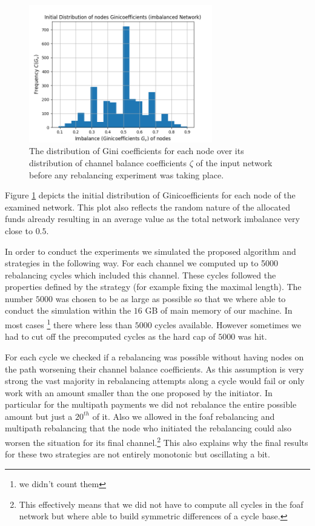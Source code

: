 \documentclass[a4paper]{paper}
\begin{document}
\begin{figure}
 \centering
 \includegraphics[width=8cm]{code/vs/fig/initial_ginis_before_rebalancing.png}
 \caption{The distribution of Gini coefficients for each node over its distribution of channel balance coefficients $\zeta$ of the input network before any rebalancing experiment was taking place.}
 \label{fig:initial_ginis}
\end{figure}
Figure \cref{fig:initial_ginis} depicts the initial distribution of Ginicoefficients for each node of the examined network.
This plot also reflects the random nature of the allocated funds already resulting in an average value as the total network imbalance very close to $0.5$.

In order to conduct the experiments we simulated the proposed algorithm and strategies in the following way.
For each channel we computed up to 5000 rebalancing cycles which included this channel.
These cycles followed the properties defined by the strategy (for example fixing the maximal length).
The number $5000$ was chosen to be as large as possible so that we where able to conduct the simulation within the $16$ GB of main memory of our machine.
In most cases \footnote{we didn't count them} there where less than $5000$ cycles available.
However sometimes we had to cut off the precomputed cycles as the hard cap of $5000$ was hit.

For each cycle we checked if a rebalancing was possible without having nodes on the path worsening their channel balance coefficients.
As this assumption is very strong the vast majority in rebalancing attempts along a cycle would fail or only work with an amount smaller than the one proposed by the initiator. 
In particular for the multipath payments we did not rebalance the entire possible amount but just a $20^{th}$ of it.
Also we allowed in the foaf rebalancing and multipath rebalancing that the node who initiated the rebalancing could also worsen the situation for its final channel.\footnote{This effectively means that we did not have to compute all cycles in the foaf network but where able to build symmetric differences of a cycle base.}
This also explains why the final results for these two strategies are not entirely monotonic but oscillating a bit.
\end{document}
